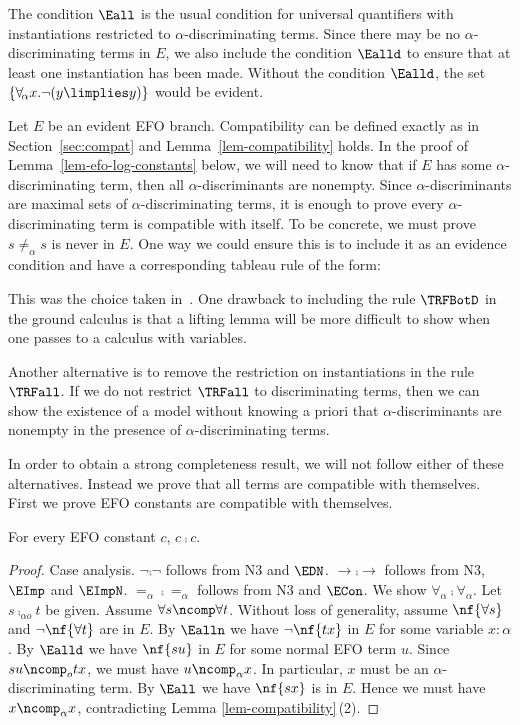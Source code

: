The condition $\Eall$ is the usual condition for universal quantifiers with instantiations restricted
to $\alpha$-discriminating terms.  Since there may be no $\alpha$-discriminating terms in $E$,
we also include the condition $\Ealld$ to ensure that at least one instantiation has been made.
Without the condition $\Ealld$, the set $\{\forall_{\!\alpha} x.\neg(y\limplies y)\}$ would be evident.


Let $E$ be an evident EFO branch. Compatibility can be defined exactly as in Section~\ref{sec:compat}
and Lemma~\ref{lem-compatibility} holds.
In the proof of Lemma~\ref{lem-efo-log-constants} below, we will need
to know that if $E$ has some $\alpha$-discriminating term,
then all $\alpha$-discriminants are nonempty.  Since $\alpha$-discriminants are
maximal sets of $\alpha$-discriminating terms, it is enough to prove
every $\alpha$-discriminating term is compatible with itself.
To be concrete, we must prove $s\not=_\alpha s$ is never in $E$.
One way we could ensure this is to include it as an evidence condition
and have a corresponding tableau rule of the form:
\begin{mathpar}
\end{mathpar}
This was the choice taken in~\cite{BrownSmolkaEFO}.
One drawback to including the rule $\TRFBotD$ in the ground calculus is that a lifting lemma
will be more difficult to show when one passes to a calculus with variables.

Another alternative is to remove the restriction on instantiations in the
rule $\TRFall$.  If we do not restrict $\TRFall$ to discriminating terms,
then we can show the existence of a model without knowing a priori
that $\alpha$-discriminants are nonempty in the presence of $\alpha$-discriminating terms.

In order to obtain a strong completeness result,
we will not follow either of these alternatives.
Instead we prove that all terms are compatible with themselves.
First we prove EFO constants are compatible with themselves.

\begin{lem}
  \label{efoconst-compat}
  For every EFO constant $c$, $c\comp c$.
\end{lem}
\begin{proof}
  Case analysis.
  $\neg\comp\neg$ follows from N3 and $\EDN$.
  $\to\comp\to$ follows from N3, $\EImp$ and $\EImpN$.
  $=_\alpha\comp =_\alpha$ follows from N3 and $\ECon$.
  We show $\forall_{\!\alpha}\comp \forall_{\!\alpha}$.
  Let $s \comp_{\alpha o} t$ be given.  Assume $\forall s \ncomp \forall t$.
  Without loss of generality, assume $\nf{\forall s}$ and $\neg\nf{\forall t}$ are in $E$.
  By $\Ealln$ we have $\neg \nf{tx}$ in $E$ for some variable $x:\alpha$.
  By $\Ealld$ we have $\nf{su}$ in $E$ for some normal EFO term $u$.
  Since $su \ncomp_o tx$, we must have $u\ncomp_\alpha x$.  In particular,
  $x$ must be an $\alpha$-discriminating term.
  By $\Eall$ we have $\nf{sx}$ is in $E$.
  Hence we must have $x\ncomp_\alpha x$, contradicting Lemma \ref{lem-compatibility}\,(2).
\end{proof}


